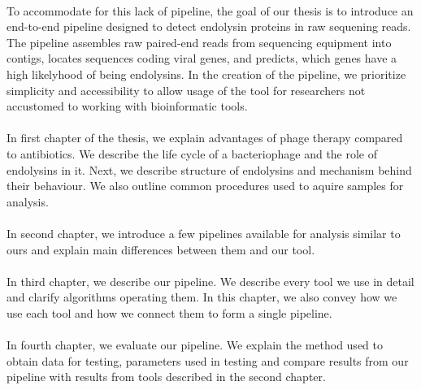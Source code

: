 \paragraph*{}
To accommodate for this lack of pipeline, the goal of our thesis is to introduce an end-to-end pipeline designed to detect endolysin proteins in raw sequening reads. The pipeline assembles raw paired-end reads from sequencing equipment into contigs, locates sequences coding viral genes, and predicts, which genes have a high likelyhood of being endolysins. In the creation of the pipeline, we prioritize simplicity and accessibility to allow usage of the tool for researchers not accustomed to working with bioinformatic tools.
\paragraph*{}
In first chapter of the thesis, we explain advantages of phage therapy compared to antibiotics. We describe the life cycle of a bacteriophage and the role of endolysins in it. Next, we describe structure of endolysins and mechanism behind their behaviour. We also outline common procedures used to aquire samples for analysis.
\paragraph*{}
In second chapter, we introduce a few pipelines available for analysis similar to ours and explain main differences between them and our tool.
\paragraph*{}
In third chapter, we describe our pipeline. We describe every tool we use in detail and clarify algorithms operating them. In this chapter, we also convey how we use each tool and how we connect them to form a single pipeline.
\paragraph*{}
In fourth chapter, we evaluate our pipeline. We explain the method used to obtain data for testing, parameters used in testing and compare results from our pipeline with results from tools described in the second chapter.
